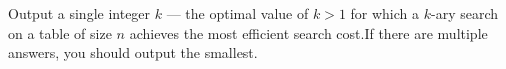 Output a single integer $k$ --- the optimal value of $k>1$ for which a $k$-ary search on a table of size $n$ achieves the most efficient search cost.If there are multiple answers, you should output the smallest.